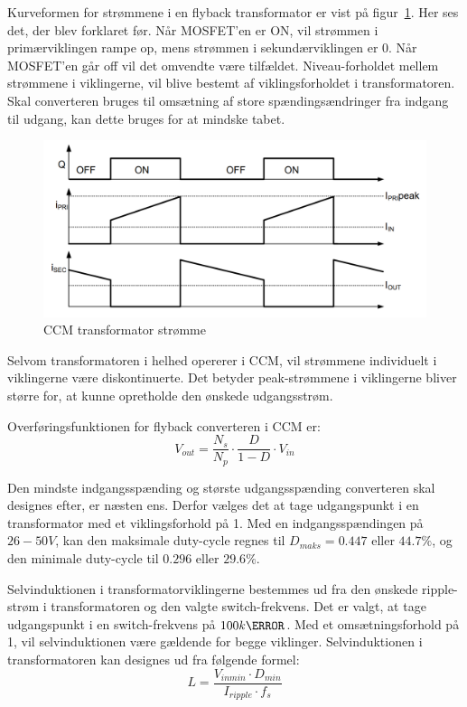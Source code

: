 Kurveformen for strømmene i en flyback transformator er vist på figur~\ref{fig:flyabck_ideal_currents}. Her ses det, der blev forklaret før. Når MOSFET'en er ON, vil strømmen i primærviklingen rampe op, mens strømmen i sekundærviklingen er 0. Når MOSFET'en går off vil det omvendte være tilfældet.  Niveau-forholdet mellem strømmene i viklingerne, vil blive bestemt af viklingsforholdet i transformatoren. Skal converteren bruges til omsætning af store spændingsændringer fra indgang til udgang, kan dette bruges for at mindske tabet. 

\begin{figure}[H]
	\centering
	\includegraphics[width=0.7\linewidth]{../Dokumentation/tex/1iteration/billeder/CCM_transformer_current.png}
	\caption{CCM transformator strømme}
	\label{fig:flyabck_ideal_currents}
\end{figure}

\noindent Selvom transformatoren i helhed opererer i CCM, vil strømmene individuelt i viklingerne være diskontinuerte. Det betyder peak-strømmene i viklingerne bliver større for, at kunne opretholde den ønskede udgangsstrøm. 

\noindent Overføringsfunktionen for flyback converteren i CCM er\cite{SMPS-topologies2}:
\begin{equation*}
	V_{out} = \frac{N_s}{N_p} \cdot \frac{D}{1-D} \cdot V_{in}
\end{equation*}

Den mindste indgangsspænding og største udgangsspænding converteren skal designes efter, er næsten ens. Derfor vælges det at tage udgangspunkt i en transformator med et viklingsforhold på 1. Med en indgangsspændingen på $26-50V$, kan den maksimale duty-cycle regnes til $D_{maks} = 0.447$ eller $44.7\percent$, og den minimale duty-cycle til $0.296$ eller $29.6\percent$.  

Selvinduktionen i transformatorviklingerne bestemmes ud fra den ønskede ripple-strøm i transformatoren og den valgte switch-frekvens. Det er valgt, at tage udgangspunkt i en switch-frekvens på $100k\hertz$. Med et omsætningsforhold på 1, vil selvinduktionen være gældende for begge viklinger. Selvinduktionen i transformatoren kan designes ud fra følgende formel\cite{flyback-formler}:
\begin{equation}
	L = \frac{V_{inmin} \cdot D_{min}}{I_{ripple} \cdot f_s}
\end{equation}

